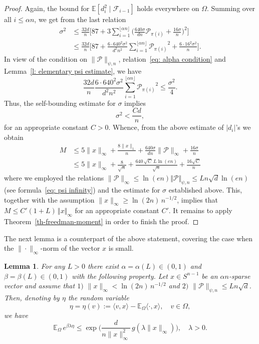 \documentclass[12pt]{article}
\newtheorem{lemma}[theorem]{Lemma}
\theoremstyle{definition}
\theoremstyle{plain}
\newcommand{\E}{\mathbb{E}}
\def\pvector{{\mathcal P}}
\def\gfunction{{g}}
\begin{document}
\begin{proof}
Again, the bound for $\E [d_i^2\mid\mathcal{F}_{i-1}]$ holds everywhere on $\Omega$.
Summing over all $i\leq \alpha n$, we get from the last relation
\begin{align*}
\sigma^2&\leq
\frac{32d}{n}
\Big[87+3\sum_{i=1}^{\lfloor \alpha n\rfloor}\Big(\frac{640\sigma}{dn}\pvector_{\pi(i)}+\frac{16\sigma}{n}\Big)^2\Big]\\
&\leq \frac{32d}{n}
\Big[87+\frac{6\cdot 640^2\sigma^2}{d^2n^2}\sum_{i=1}^{\lfloor \alpha n\rfloor}
{\pvector_{\pi(i)}}^2+\frac{6\cdot 16^2\sigma^2}{n}\Big].
\end{align*}
In view of the condition on $\|\pvector\|_{\psi,n}$, relation~\eqref{eq: alpha condition}
and Lemma~\ref{l: elementary psi estimate}, we have
$$\frac{32d}{n}\frac{6\cdot 640^2\sigma^2}{d^2n^2}\sum_{i=1}^{\lfloor \alpha n\rfloor}
{\pvector_{\pi(i)}}^2\leq \frac{\sigma^2}{4}.$$
Thus, the self-bounding estimate for $\sigma$ implies
$$\sigma^2< \frac{Cd}{n},$$
for an appropriate constant $C>0$. 
Whence, from the above estimate of $|d_i|$'s we obtain
\begin{align*}
M&\leq 5\|x\|_\infty+\frac{8\|x\|_1}{n}
+\frac{640\sigma}{dn}\|\pvector\|_\infty+\frac{16\sigma}{n}\\
&\leq  5\|x\|_\infty+\frac{8}{\sqrt{n}}+ \frac{640\, \sqrt{C}\, L\ln(en)}{\sqrt{n}}+ \frac{16\sqrt{C}}{n}
\end{align*}
where we employed the relations $\|\pvector\|_\infty\leq \ln(en) \Vert \pvector\Vert_{\psi,n}\leq L n\sqrt{d}\ln (en)$
(see formula~\eqref{eq: psi infinity}) and the estimate for $\sigma$ established above.
This, together with the assumption $\|x\|_\infty\geq \ln(2n)\, n^{-1/2}$,
implies that $M\leq C'(1+L)\, \Vert x\Vert_\infty$ for an appropriate constant $C'$. 
It remains to apply Theorem~\ref{th-freedman-moment} in order to finish the proof.
\end{proof}
The next lemma is a counterpart of the above statement, covering the case when the $\|\cdot\|_\infty$-norm
of the vector $x$ is small.
\begin{lemma}\label{l: small linfty norm}
For any $L>0$ there exist $\alpha=\alpha(L)\in(0,1)$ and $\beta=\beta(L)\in(0,1)$ with the following property.
Let $x\in S^{n-1}$ be an $\alpha n$-sparse vector and assume that
$1)$ $\|x\|_\infty < \ln(2n)\, n^{-1/2}$ and $2)$
$\|\pvector\|_{\psi,n}\leq L n\sqrt{d}$.
Then, denoting by $\eta$ the random variable
$$\eta=\eta(v):=\langle v,x\rangle - \E_\Omega \langle \cdot,x\rangle,\quad v\in\Omega,$$
we have
$$\E_\Omega\, e^{\beta\lambda \eta}
\leq \exp\bigg(\frac{d}{n\|x\|_\infty^2}\,\gfunction(\lambda \|x\|_\infty)\bigg),\quad \lambda>0.$$
\end{lemma}
\end{document}
